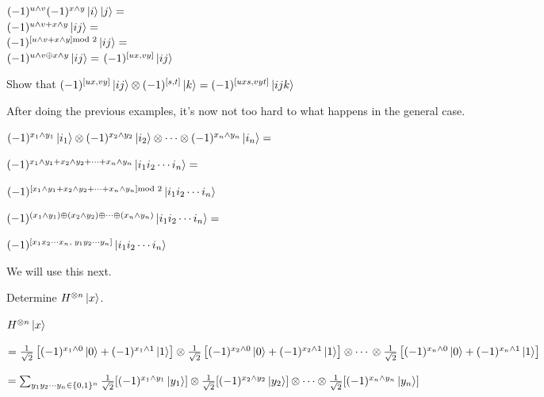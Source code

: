 \frmrule

$(-1)^{u \wedge v} (-1)^{x \wedge y} \left|i\right\rangle \left|j\right\rangle = $\\
$(-1)^{u \wedge v + x \wedge y} \left|ij\right\rangle = $\\
$(-1)^{[u \wedge v + x \wedge y]\text{mod } 2} \left|ij\right\rangle = $\\
$(-1)^{u \wedge v \oplus x \wedge y} \left|ij\right\rangle = $
$(-1)^{[ux, vy]} \left|ij\right\rangle $


\frmrule

\begin{example}
Show that $(-1)^{[ux,vy]}\left|ij\right\rangle \otimes (-1)^{[s, t]}\left|k\right\rangle = (-1)^{[uxs,vyt]}\left|ijk\right\rangle$ 
\end{example}

\frmrule

After doing the previous examples, it's now not too hard to what happens 
in the general case. 

$(-1)^{x_1 \wedge y_1}\left|i_1\right\rangle \otimes
(-1)^{x_2 \wedge y_2}\left|i_2\right\rangle \otimes
\dotsm \otimes
(-1)^{x_n \wedge y_n}\left|i_n\right\rangle = $ 

$(-1)^{x_1 \wedge y_1 + x_2 \wedge y_2 + \dotsm + x_n \wedge y_n}\left|i_1 i_2 \dotsm i_n\right\rangle = $

$(-1)^{[x_1 \wedge y_1 + x_2 \wedge y_2 + \dotsm + x_n \wedge y_n] \text{mod } 2}\left|i_1 i_2 \dotsm i_n\right\rangle$

$(-1)^{(x_1 \wedge y_1) \oplus (x_2 \wedge y_2) \oplus \dotsm \oplus (x_n \wedge y_n)}
\left|i_1 i_2 \dotsm i_n\right\rangle =$

$(-1)^{[x_1 x_2 \dotsm x_n, \; y_1 y_2 \dotsm y_n]}
\left|i_1 i_2 \dotsm i_n\right\rangle$

We will use this next.

\frmrule


\begin{example}
Determine $H^{\otimes n}\left|x\right\rangle$.
\end{example}


$H^{\otimes n}\left|x\right\rangle$

$= 
\frac{1}{\sqrt{2}} \left[(-1)^{x_1 \wedge 0} \left|0\right\rangle + (-1)^{x_1 \wedge 1} \left|1\right\rangle \right] \otimes
\frac{1}{\sqrt{2}} \left[(-1)^{x_2 \wedge 0} \left|0\right\rangle + (-1)^{x_2 \wedge 1} \left|1\right\rangle \right] \otimes
\dotsm 
\\ \otimes \frac{1}{\sqrt{2}} \left[(-1)^{x_n \wedge 0} \left|0\right\rangle + (-1)^{x_n \wedge 1} \left|1\right\rangle \right]
$

$= \sum_{y_1 y_2 \dotsm y_n \in \{0,1\}^n}
\frac{1}{\sqrt{2}} [(-1)^{x_1 \wedge y_1}\left|y_1\right\rangle] \otimes \frac{1}{\sqrt{2}} [(-1)^{x_2 \wedge y_2}\left|y_2\right\rangle] 
\otimes \dotsm \otimes \frac{1}{\sqrt{2}} [(-1)^{x_n \wedge y_n}\left|y_n\right\rangle]
$

